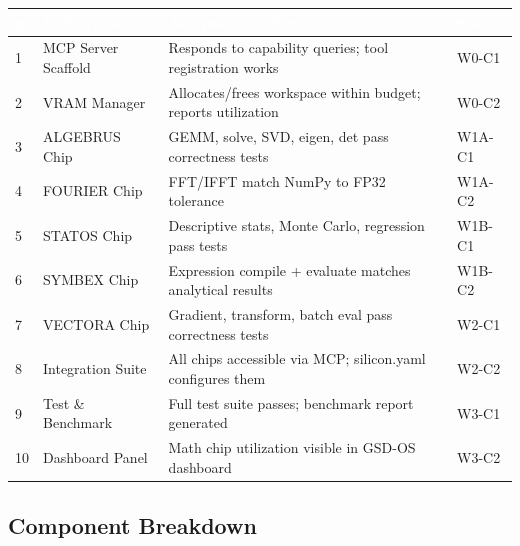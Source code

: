 \documentclass[11pt,letterpaper]{article}
\newcommand{\tableheader}[1]{\textbf{\sffamily\textcolor{white}{#1}}}
\begin{document}
\begin{center}
\begin{tabularx}{\textwidth}{C{0.6cm}L{3.5cm}X L{2.5cm}}
\toprule
{}
\tableheader{\#} & \tableheader{Deliverable} & \tableheader{Acceptance Criteria} & \tableheader{Spec} \\
 & MCP Server Scaffold & Responds to capability queries; tool registration works & W0-C1 \\
2 & VRAM Manager & Allocates/frees workspace within budget; reports utilization & W0-C2 \\
3 & ALGEBRUS Chip & GEMM, solve, SVD, eigen, det pass correctness tests & W1A-C1 \\
4 & FOURIER Chip & FFT/IFFT match NumPy to FP32 tolerance & W1A-C2 \\
5 & STATOS Chip & Descriptive stats, Monte Carlo, regression pass tests & W1B-C1 \\
6 & SYMBEX Chip & Expression compile + evaluate matches analytical results & W1B-C2 \\
7 & VECTORA Chip & Gradient, transform, batch eval pass correctness tests & W2-C1 \\
8 & Integration Suite & All chips accessible via MCP; silicon.yaml configures them & W2-C2 \\
9 & Test \& Benchmark & Full test suite passes; benchmark report generated & W3-C1 \\
10 & Dashboard Panel & Math chip utilization visible in GSD-OS dashboard & W3-C2 \\
\bottomrule
\end{tabularx}
\end{center}

\subsection{Component Breakdown}
\end{document}
